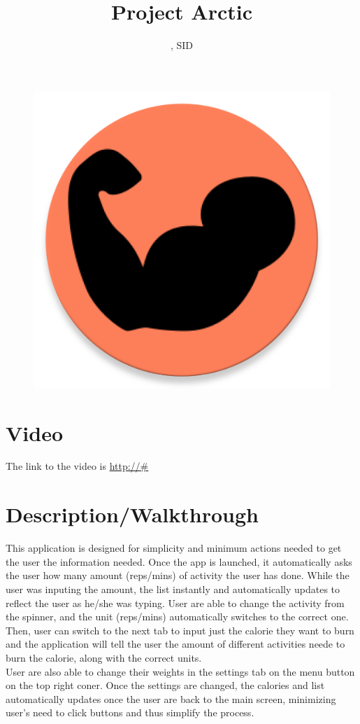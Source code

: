 \documentclass[11pt]{article}
\title{Project Arctic}
\author{\Name, SID \SID}
\date{}
\newcommand{\tab}{\hspace*{25pt}}
\begin{document}
\maketitle
\begin{figure}[ht]
	\includegraphics[scale=0.5]{icon.png}
	\centering
\end{figure}

\newpage
\section{Video}
The link to the video is \url{http://#}

\section{Description/Walkthrough}
\tab This application is designed for simplicity and minimum actions needed to get the 
user the information needed. Once the app is launched, it automatically asks the user how many
amount (reps/mins) of activity the user has done. While the user was inputing the amount, the
list instantly and automatically updates to reflect the user as he/she was typing. User
are able to change the activity from the spinner, and the unit (reps/mins) automatically
switches to the correct one. Then, user can switch to the next tab to input just the calorie
they want to burn and the application will tell the user the amount of different activities
neede to burn the calorie, along with the correct units.\\
\tab User are also able to change their weights in the settings tab on the menu button on
the top right coner. Once the settings are changed, the calories and list automatically updates
once the user are back to the main screen, minimizing user's need to click buttons and thus
simplify the process.
\end{document}
